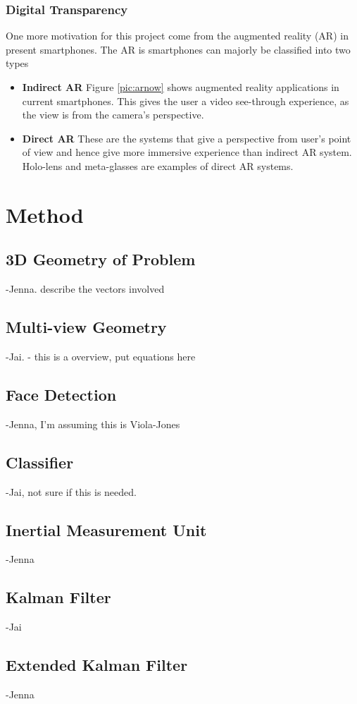 \documentclass[12pt,twocolumn,letterpaper]{article}
\begin{document}
\subsubsection{Digital Transparency}
One more motivation for this project come from the augmented reality (AR) in present smartphones. The AR is smartphones can majorly be classified into two types
\begin{itemize}
\item \textbf{Indirect AR} Figure \ref{pic:arnow} shows augmented reality applications in current smartphones. This gives the user a video see-through experience, as the view is from the camera's perspective.
\item \textbf{Direct AR} These are the systems that give a perspective from user's point of view and hence give more immersive experience than indirect AR system. Holo-lens and meta-glasses are examples of direct AR systems. 
\end{itemize}

\section{Method}
\subsection{3D Geometry of Problem}
    -Jenna. describe the vectors involved
\subsection{Multi-view Geometry}
    -Jai. - this is a overview, put equations here
\subsection{Face Detection}
    -Jenna, I'm assuming this is Viola-Jones
\subsection{Classifier}
    -Jai, not sure if this is needed.
\subsection{Inertial Measurement Unit}
    -Jenna
\subsection{Kalman Filter}
    -Jai
\subsection{Extended Kalman Filter}
    -Jenna
\end{document}

